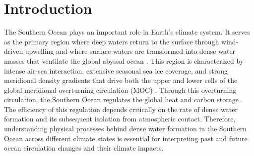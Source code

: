 \documentclass[pdflatex,sn-nature]{sn-jnl}
\begin{document}

\maketitle

\section{Introduction}


The Southern Ocean plays an important role in Earth's climate system. It serves as the primary region where deep waters return to the surface through wind-driven upwelling and where surface waters are transformed into dense water masses that ventilate the global abyssal ocean \cite{Marshall2012,Talley2013}. This region is characterized by intense air-sea interaction, extensive seasonal sea ice coverage, and strong meridional density gradients that drive both the upper and lower cells of the global meridional overturning circulation (MOC) \cite{Speer2000,Lumpkin2007}. Through this overturning circulation, the Southern Ocean regulates the global heat and carbon storage \cite{Marinov2006,Gray2024}. The efficiency of this regulation depends critically on the rate of dense water formation and its subsequent isolation from atmospheric contact. Therefore, understanding physical processes behind dense water formation in the Southern Ocean across different climate states is essential for interpreting past and future ocean circulation changes and their climate impacts.

\end{document}
